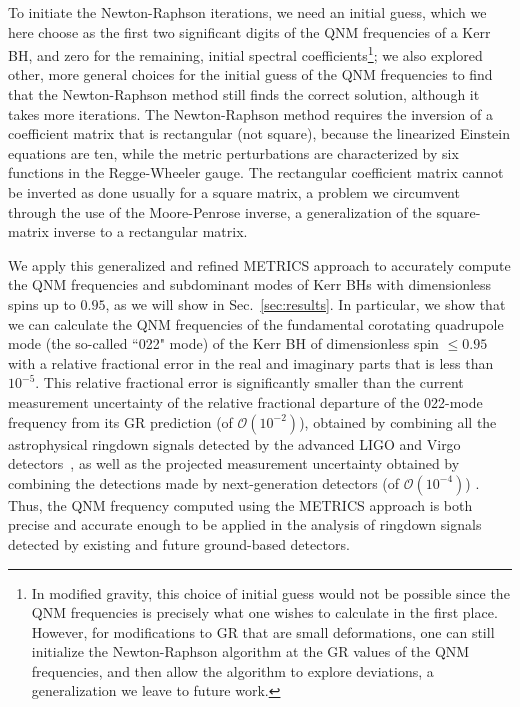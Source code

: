 \documentclass[aps,prx,amsmath,floats,floatfix,twocolumn,
  superscriptaddress,nofootinbib,showpacs]{revtex4-1}
\begin{document}
To initiate the Newton-Raphson iterations, we need an initial guess, which we here choose as the first two significant digits of the QNM frequencies of a Kerr BH, and zero for the remaining, initial spectral coefficients\footnote{In modified gravity, this choice of initial guess would not be possible since the QNM frequencies is precisely what one wishes to calculate in the first place. 
However, for modifications to GR that are small deformations, one can still initialize the Newton-Raphson algorithm at the GR values of the QNM frequencies, and then allow the algorithm to explore deviations, a generalization we leave to future work.}; we also explored other, more general choices for the initial guess of the QNM frequencies to find that the Newton-Raphson method still finds the correct solution, although it takes more iterations. 
The Newton-Raphson method requires the inversion of a coefficient matrix that is rectangular (not square), because the linearized Einstein equations are ten, while the metric perturbations are characterized by six functions in the Regge-Wheeler gauge. 
The rectangular coefficient matrix cannot be inverted as done usually for a square matrix, a problem we circumvent through the use of the Moore-Penrose inverse, a generalization of the square-matrix inverse to a rectangular matrix.

We apply this generalized and refined METRICS approach to accurately compute the QNM frequencies and subdominant modes of Kerr BHs with dimensionless spins up to $0.95$, as we will show in Sec.~\ref{sec:results}. 
In particular, we show that we can calculate the QNM frequencies of the fundamental corotating quadrupole mode (the so-called ``022" mode) of the Kerr BH of dimensionless spin $\leq 0.95 $ with a relative fractional error in the real and imaginary parts that is less than $10^{-5}$.
This relative fractional error is significantly smaller than the current measurement uncertainty of the relative fractional departure of the 022-mode frequency from its GR prediction (of $\mathcal{O}(10^{-2})$), obtained by combining all the astrophysical ringdown signals detected by the advanced LIGO and Virgo detectors~\cite{LIGOScientific:2021sio}, as well as the projected measurement uncertainty obtained by combining the detections made by next-generation detectors (of $\mathcal{O}(10^{-4})$) \cite{Maselli:2023khq}.
Thus, the QNM frequency computed using the METRICS approach is both precise and accurate enough to be applied in the analysis of ringdown signals detected by existing and future ground-based detectors. 
\end{document}
